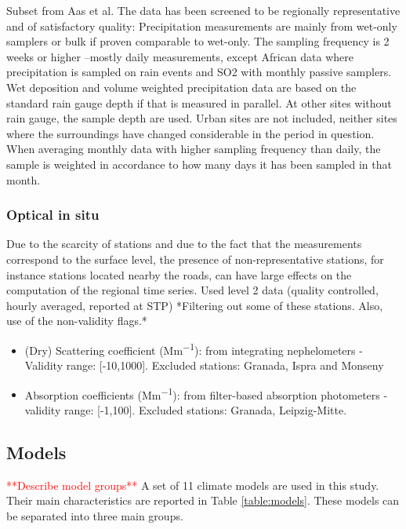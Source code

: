 \documentclass[journal abbreviation, manuscript]{copernicus}
\begin{document}
Subset from Aas et al.
The data has been screened to be regionally representative and of satisfactory quality:
Precipitation measurements are mainly from wet-only samplers or bulk if proven comparable to wet-only.
The sampling frequency is 2 weeks or higher –mostly daily measurements, except African data where precipitation is sampled on rain events and SO2 with monthly passive samplers.
Wet deposition and volume weighted precipitation data are based on the standard rain gauge depth if that is measured in parallel. At other sites without rain gauge, the sample depth are used.
Urban sites are not included, neither sites where the surroundings have changed considerable in the period in question.
When averaging monthly data with higher sampling frequency than daily, the sample is weighted in accordance to how many days it has been sampled in that month.

\subsubsection{Optical in situ}
Due to the scarcity of stations and due to the fact that the measurements correspond to the surface level, the presence of non-representative stations, for instance stations located nearby the roads, can have large effects on the computation of the regional time series. Used level 2 data (quality controlled, hourly averaged, reported at STP) *Filtering out some of these stations. Also, use of the non-validity flags.*

\begin{itemize}
 \item (Dry) Scattering coefficient (\unit{Mm^{-1}}): from integrating nephelometers - Validity range: [-10,1000]. Excluded stations: Granada, Ispra and Monseny
 \item Absorption coefficients (\unit{Mm^{-1}}): from filter-based absorption photometers - validity range: [-1,100]. Excluded stations: Granada, Leipzig-Mitte.
\end{itemize}

\subsection{Models}
\textcolor{red}{**Describe model groups**}
A set of 11 climate models are used in this study. Their main characteristics are reported in Table \ref{table:models}. These models can be separated into three main groups.
\end{document}
